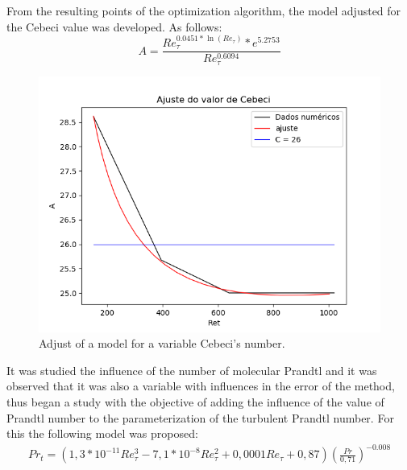 \documentclass[10pt]{article} %
\begin{document}
 From the resulting points of the optimization algorithm, the model adjusted for the Cebeci value was developed. As follows:
\begin{equation}
A = \frac{Re_\tau ^{0.0451 * \ln(Re_\tau)} *e ^ {5.2753} }{Re_\tau ^{0.6094}}
\end{equation}
\begin{figure}[!h]
	\centering
	\includegraphics[angle=0, scale=0.45]{ajustecebeci}
	\caption{Adjust of a model for a variable Cebeci's number.}
\end{figure}
It was studied the influence of the number of molecular Prandtl and it was observed that it was also a variable with influences in the error of the method, thus began a study with the objective of adding the influence of the value of Prandtl number to the parameterization of the turbulent Prandtl number. For this the following model was proposed:
\begin{equation}
\begin{split}
Pr_t = \left( 1,3 * 10^{-11} Re_\tau^3 - 7,1 * 10^{-8} Re_\tau^2 + 0,0001 Re_\tau + 0,87 \right) \left(  \frac{Pr}{0,71}\right) ^{-0.008}
\end{split}
\end{equation}
\end{document}
